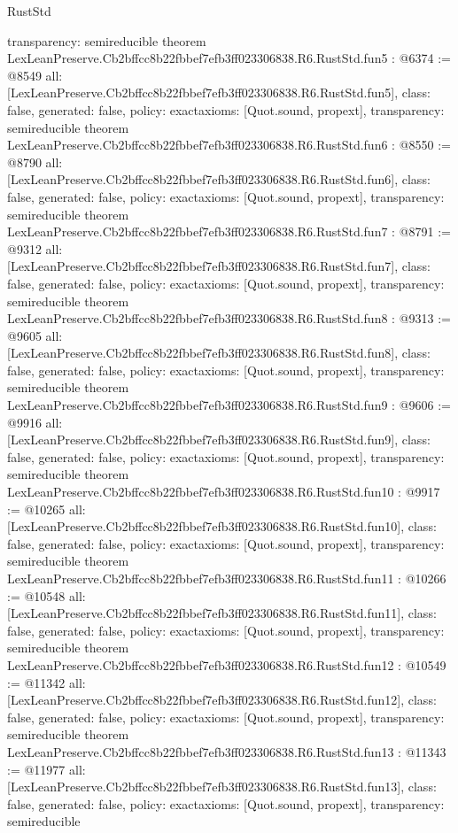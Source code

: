 \begin{lexlean}{RustStd}
\begin{coremodule}
{  transparency: semireducible
}
theorem LexLeanPreserve.Cb2bffcc8b22fbbef7efb3ff023306838.R6.RustStd.fun5 : @6374 := @8549 {
  all: [LexLeanPreserve.Cb2bffcc8b22fbbef7efb3ff023306838.R6.RustStd.fun5],
  class: false,
  generated: false,
  policy: exact{axioms: [Quot.sound, propext]},
  transparency: semireducible
}
theorem LexLeanPreserve.Cb2bffcc8b22fbbef7efb3ff023306838.R6.RustStd.fun6 : @8550 := @8790 {
  all: [LexLeanPreserve.Cb2bffcc8b22fbbef7efb3ff023306838.R6.RustStd.fun6],
  class: false,
  generated: false,
  policy: exact{axioms: [Quot.sound, propext]},
  transparency: semireducible
}
theorem LexLeanPreserve.Cb2bffcc8b22fbbef7efb3ff023306838.R6.RustStd.fun7 : @8791 := @9312 {
  all: [LexLeanPreserve.Cb2bffcc8b22fbbef7efb3ff023306838.R6.RustStd.fun7],
  class: false,
  generated: false,
  policy: exact{axioms: [Quot.sound, propext]},
  transparency: semireducible
}
theorem LexLeanPreserve.Cb2bffcc8b22fbbef7efb3ff023306838.R6.RustStd.fun8 : @9313 := @9605 {
  all: [LexLeanPreserve.Cb2bffcc8b22fbbef7efb3ff023306838.R6.RustStd.fun8],
  class: false,
  generated: false,
  policy: exact{axioms: [Quot.sound, propext]},
  transparency: semireducible
}
theorem LexLeanPreserve.Cb2bffcc8b22fbbef7efb3ff023306838.R6.RustStd.fun9 : @9606 := @9916 {
  all: [LexLeanPreserve.Cb2bffcc8b22fbbef7efb3ff023306838.R6.RustStd.fun9],
  class: false,
  generated: false,
  policy: exact{axioms: [Quot.sound, propext]},
  transparency: semireducible
}
theorem LexLeanPreserve.Cb2bffcc8b22fbbef7efb3ff023306838.R6.RustStd.fun10 : @9917 := @10265 {
  all: [LexLeanPreserve.Cb2bffcc8b22fbbef7efb3ff023306838.R6.RustStd.fun10],
  class: false,
  generated: false,
  policy: exact{axioms: [Quot.sound, propext]},
  transparency: semireducible
}
theorem LexLeanPreserve.Cb2bffcc8b22fbbef7efb3ff023306838.R6.RustStd.fun11 : @10266 := @10548 {
  all: [LexLeanPreserve.Cb2bffcc8b22fbbef7efb3ff023306838.R6.RustStd.fun11],
  class: false,
  generated: false,
  policy: exact{axioms: [Quot.sound, propext]},
  transparency: semireducible
}
theorem LexLeanPreserve.Cb2bffcc8b22fbbef7efb3ff023306838.R6.RustStd.fun12 : @10549 := @11342 {
  all: [LexLeanPreserve.Cb2bffcc8b22fbbef7efb3ff023306838.R6.RustStd.fun12],
  class: false,
  generated: false,
  policy: exact{axioms: [Quot.sound, propext]},
  transparency: semireducible
}
theorem LexLeanPreserve.Cb2bffcc8b22fbbef7efb3ff023306838.R6.RustStd.fun13 : @11343 := @11977 {
  all: [LexLeanPreserve.Cb2bffcc8b22fbbef7efb3ff023306838.R6.RustStd.fun13],
  class: false,
  generated: false,
  policy: exact{axioms: [Quot.sound, propext]},
  transparency: semireducible
}
\end{coremodule}
\end{lexlean}
